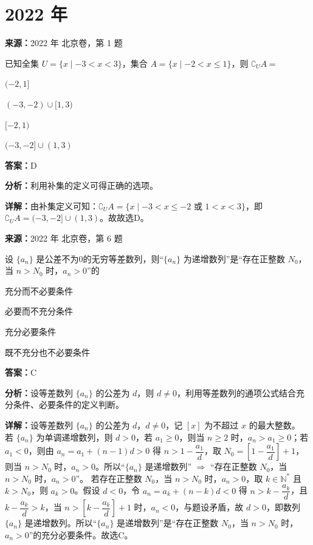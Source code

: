 \section*{2022 年}

\begin{question}[points=4]
\textbf{来源：}2022 年 北京卷，第 1 题\par
已知全集 $U = \{x \mid -3 < x < 3\}$，集合 $A = \{x \mid -2 < x \leq 1\}$，则 $\complement_U A =$
\begin{choices}
  \item $(-2,1]$
  \item $(-3,-2) \cup [1,3)$
  \item $[-2,1)$
  \item $(-3,-2] \cup (1,3)$
\end{choices}
\begin{solution}
\textbf{答案：}D

\textbf{分析：}利用补集的定义可得正确的选项。

\textbf{详解：}由补集定义可知：$\complement_U A = \{x \mid -3 < x \leq -2 \text{ 或 } 1 < x < 3\}$，即 $\complement_U A = (-3,-2] \cup (1,3)$。故故选D。
\end{solution}
\end{question}

\begin{question}[points=4]
\textbf{来源：}2022 年 北京卷，第 6 题\par
设 $\{a_n\}$ 是公差不为0的无穷等差数列，则“$\{a_n\}$ 为递增数列”是“存在正整数 $N_0$，当 $n > N_0$ 时，$a_n > 0$”的
\begin{choices}
  \item 充分而不必要条件
  \item 必要而不充分条件
  \item 充分必要条件
  \item 既不充分也不必要条件
\end{choices}
\begin{solution}
\textbf{答案：}C

\textbf{分析：}设等差数列 $\{a_n\}$ 的公差为 $d$，则 $d \neq 0$，利用等差数列的通项公式结合充分条件、必要条件的定义判断。

\textbf{详解：}设等差数列 $\{a_n\}$ 的公差为 $d$，$d \neq 0$，记 $[x]$ 为不超过 $x$ 的最大整数。
若 $\{a_n\}$ 为单调递增数列，则 $d > 0$，若 $a_1 \ge 0$，则当 $n \ge 2$ 时，$a_n > a_1 \ge 0$；若 $a_1 < 0$，则由 $a_n = a_1 + (n-1)d > 0$ 得 $n > 1 - \dfrac{a_1}{d}$，取 $N_0 = \left[1 - \dfrac{a_1}{d}\right] + 1$，则当 $n > N_0$ 时，$a_n > 0$。所以“$\{a_n\}$ 是递增数列” $\Rightarrow$ “存在正整数 $N_0$，当 $n > N_0$ 时，$a_n > 0$”。
若存在正整数 $N_0$，当 $n > N_0$ 时，$a_n > 0$，取 $k \in \mathbb{N}^*$ 且 $k > N_0$，则 $a_k > 0$。假设 $d < 0$，令 $a_n = a_k + (n-k)d < 0$ 得 $n > k - \dfrac{a_k}{d}$，且 $k - \dfrac{a_k}{d} > k$，当 $n > \left[k - \dfrac{a_k}{d}\right] + 1$ 时，$a_n < 0$，与题设矛盾，故 $d > 0$，即数列 $\{a_n\}$ 是递增数列。所以“$\{a_n\}$ 是递增数列”是“存在正整数 $N_0$，当 $n > N_0$ 时，$a_n > 0$”的充分必要条件。故选C。
\end{solution}
\end{question}


